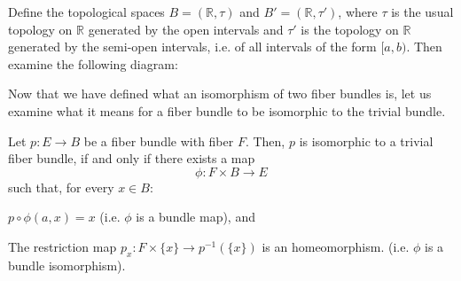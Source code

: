 




\begin{example} Define the topological spaces $B=(\mathbb{R}, \tau)$ and $B'=(\mathbb{R}, \tau')$, where $\tau$ is the usual topology on $\mathbb{R}$ generated by the open intervals and $\tau'$ is the topology on $\mathbb{R}$ generated by the semi-open intervals, i.e. of all intervals of the form $[a,b)$. Then examine the following diagram:
\begin{center}
\end{center}
\end{example}

Now that we have defined what an isomorphism of two fiber bundles is, let us examine what it means for a fiber bundle to be isomorphic to the trivial bundle.

\begin{remark}
Let $p:E\to B$ be a fiber bundle with fiber $F$. Then, $p$ is isomorphic to a trivial fiber bundle, if and only if there exists a map
\[\phi:F\times B\to E\]
such that, for every $x\in B$:
\begin{i_enum}
\item $p\circ\phi(a,x)=x$ (i.e. $\phi$ is a bundle map), and
\item The restriction map $p_x:F\times\{x\}\to p^{-1}(\{x\})$ is an homeomorphism. (i.e. $\phi$ is a bundle isomorphism).
\end{i_enum}
\end{remark}








%
%
%
%
%
